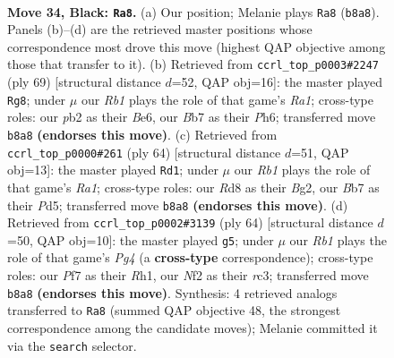 \documentclass[11pt]{article}
\begin{document}
\clearpage

\begin{figure}[p]\centering
\begin{subfigure}{0.46\textwidth}\centering
\resizebox{\linewidth}{!}{%
\newchessgame
\chessboard[
  setfen={1r1r4/pb1p1pk1/8/4R3/6P1/8/PP1K1n2/2B2BR1 b - - 1 34},
  showmover=false,
  pgfstyle=straightmove, color=movearrow, markmove={b8-a8}
]}
\caption{}
\end{subfigure}\hfill
\begin{subfigure}{0.46\textwidth}\centering
\resizebox{\linewidth}{!}{%
\newchessgame
\chessboard[
  setfen={r7/4k3/1p2b2p/p3r2P/3R4/P2B4/3K3R/8 b - - 0 35},
  showmover=false,
  pgfstyle=straightmove, color=movearrow, markmove={a8-g8}
]}
\caption{}
\end{subfigure}
\\[4pt]
\begin{subfigure}{0.46\textwidth}\centering
\resizebox{\linewidth}{!}{%
\newchessgame
\chessboard[
  setfen={4brk1/1R3p2/p6p/3P4/2r5/P5P1/6B1/R5K1 w - - 0 33},
  showmover=false,
  pgfstyle=straightmove, color=movearrow, markmove={a1-d1}
]}
\caption{}
\end{subfigure}\hfill
\begin{subfigure}{0.46\textwidth}\centering
\resizebox{\linewidth}{!}{%
\newchessgame
\chessboard[
  setfen={2r5/4kpp1/7p/8/R1b3PP/P1r1P3/5KB1/7R w - - 0 33},
  showmover=false,
  pgfstyle=straightmove, color=movearrow, markmove={g4-g5}
]}
\caption{}
\end{subfigure}
\caption{\textbf{Move 34, Black: \texttt{Ra8}.} (a) Our position; Melanie plays \texttt{Ra8} (\texttt{b8a8}). Panels (b)--(d) are the retrieved master positions whose correspondence most drove this move (highest QAP objective among those that transfer to it). (b) Retrieved from \texttt{ccrl\_top\_p0003\#2247} (ply 69) [structural distance $d$=52, QAP obj=16]: the master played \texttt{Rg8}; under $\mu$ our \emph{Rb1} plays the role of that game's \emph{Ra1}; cross-type roles: our \emph{p}b2 as their \emph{B}e6, our \emph{B}b7 as their \emph{P}h6; transferred move \texttt{b8a8} \textbf{(endorses this move)}. (c) Retrieved from \texttt{ccrl\_top\_p0000\#261} (ply 64) [structural distance $d$=51, QAP obj=13]: the master played \texttt{Rd1}; under $\mu$ our \emph{Rb1} plays the role of that game's \emph{Ra1}; cross-type roles: our \emph{R}d8 as their \emph{B}g2, our \emph{B}b7 as their \emph{P}d5; transferred move \texttt{b8a8} \textbf{(endorses this move)}. (d) Retrieved from \texttt{ccrl\_top\_p0002\#3139} (ply 64) [structural distance $d$=50, QAP obj=10]: the master played \texttt{g5}; under $\mu$ our \emph{Rb1} plays the role of that game's \emph{Pg4} (a \textbf{cross-type} correspondence); cross-type roles: our \emph{P}f7 as their \emph{R}h1, our \emph{N}f2 as their \emph{r}c3; transferred move \texttt{b8a8} \textbf{(endorses this move)}. Synthesis: 4 retrieved analogs transferred to \texttt{Ra8} (summed QAP objective 48, the strongest correspondence among the candidate moves); Melanie committed it via the \texttt{search} selector.}
\label{fig:thought-m67}
\end{figure}
\end{document}
